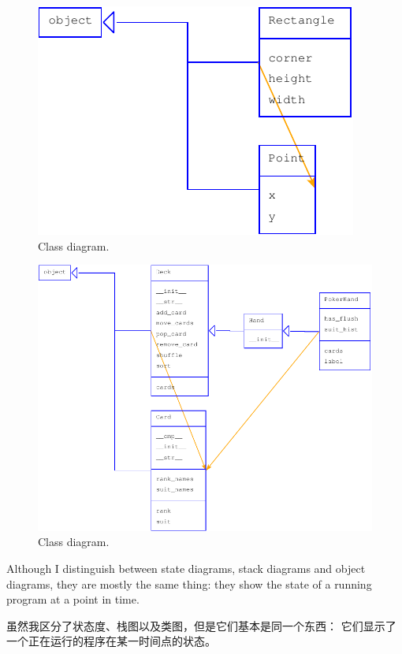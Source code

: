 \documentclass[10pt]{book}
\begin{document}
\begin{CJK}{UTF8}{gbsn}
\begin{figure}
\centerline
{\includegraphics[scale=0.7]{figs/lumpydemo7.pdf}}
\caption{Class diagram.}
\label{fig.lumpy7}
\end{figure}

\begin{figure}
\centerline
{\includegraphics[scale=0.7]{figs/lumpydemo8.pdf}}
\caption{Class diagram.}
\label{fig.lumpy8}
\end{figure}

Although I distinguish between state diagrams, stack diagrams and
object diagrams, they are mostly the same thing: they show the
state of a running program at a point in time.

虽然我区分了状态度、栈图以及类图，但是它们基本是同一个东西：
它们显示了一个正在运行的程序在某一时间点的状态。


\end{CJK}
\end{document}
